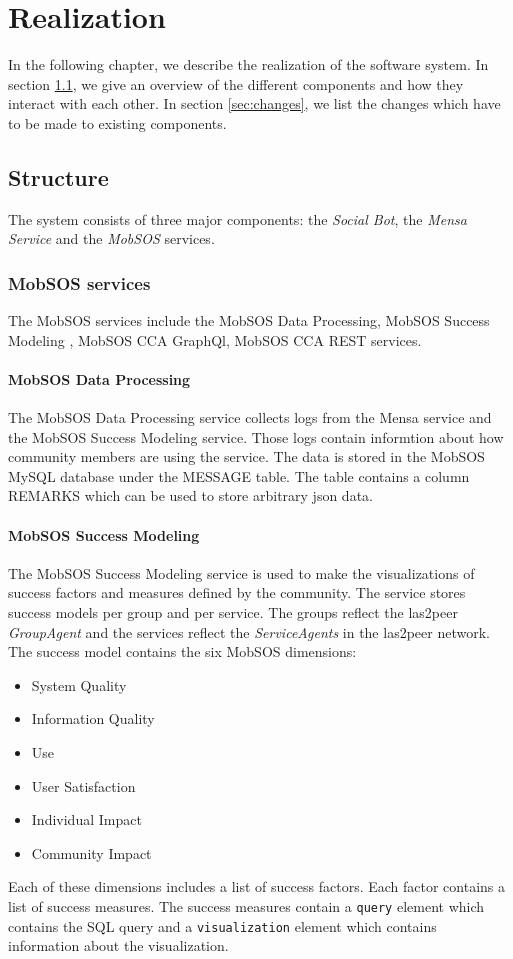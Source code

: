 \chapter{Realization}

In the following chapter, we describe the realization of the software system. In section \ref{sec:structure}, we give an overview of the different components and how they interact with each other. In section \ref{sec:changes}, we list the changes which have to be made to existing components.

\section{Structure}\label{sec:structure}

The system consists of three major components: the \emph{Social Bot}, the \emph{Mensa Service} and the \emph{MobSOS} services. 

\subsection{MobSOS services}
The MobSOS services include the MobSOS Data Processing, MobSOS Success Modeling , MobSOS CCA GraphQl, MobSOS CCA REST services.

\subsubsection{MobSOS Data Processing}
The MobSOS Data Processing service collects logs from the Mensa service and the MobSOS Success Modeling service. Those logs contain informtion about how community members are using the service. The data is stored in the MobSOS MySQL database under the MESSAGE table. The table contains a column REMARKS which can be used to store arbitrary json data.

\subsubsection{MobSOS Success Modeling}
The MobSOS Success Modeling service is used to make the visualizations of success factors and measures defined by the community. The service stores success models per group and per service. 
The groups reflect the las2peer \emph{GroupAgent} and the services reflect the \emph{ServiceAgents} in the las2peer network.
The success model contains the six MobSOS dimensions:
\begin{itemize}
    \item System Quality
    \item Information Quality
    \item Use 
    \item User Satisfaction
    \item Individual Impact 
    \item Community Impact
\end{itemize}
Each of these dimensions includes a list of success factors.
Each factor contains a list of success measures. The success measures contain a \texttt{query} element which contains the SQL query and a \texttt{visualization} element which contains information about the visualization.

